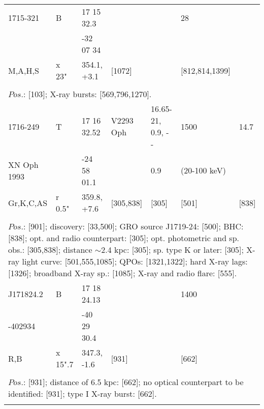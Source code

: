 \documentclass{aa}
\begin{document}
\begin{tabular}{p{2.5cm}p{1cm}p{1.8cm}p{2.3cm}p{3.3cm}p{2.0cm}p{2.2cm}}
\noalign{\smallskip}
1715-321        & B               & 17 15 32.3         &                      &                           & 28                        &     \\
                         &                   & -32 07 34           &                      &                           &                              &      \\
M,A,H,S          & x 23"        & 354.1, +3.1        & [1072]          &                           & [812,814,1399]  &       \\
\\
\multicolumn{7}{p{17.5cm}}{
$Pos$.: [103]; X-ray bursts: [569,796,1270].}\\
\noalign{\smallskip}
\hline

\noalign{\smallskip}
1716-249          & T             & 17 16 32.52     & V2293 Oph     & 16.65-21, 0.9, - -     & 1500                  & 14.7     \\
XN Oph 1993  &                 & -24 58 01.1     &                           & 0.9                             & (20-100 keV)   &    \\
Gr,K,C,AS        & r 0.5"     & 359.8, +7.6      & [305,838]         & [305]                         & [501]                 & [838]   \\
\\
\multicolumn{7}{p{17.5cm}}{
$Pos$.: [901]; discovery: [33,500]; GRO source J1719-24: [500]; BHC: [838]; opt. and radio counterpart: [305]; opt. 
photometric and sp. obs.: [305,838]; distance $\sim$2.4 kpc: [305]; sp. type K or later: [305]; X-ray light curve: 
[501,555,1085]; QPOs: [1321,1322]; hard X-ray lags: [1326]; broadband X-ray sp.: [1085];
X-ray and radio flare: [555].}\\
\noalign{\smallskip}
\hline

\noalign{\smallskip}
J171824.2    &  B           & 17 18 24.13   &                    &          & 1400             &      \\
-402934        &                & -40 29 30.4    &                    &           &                       &    \\
R,B                & x 15".7   & 347.3, -1.6     & [931]          &           & [662]            &    \\
\\
\multicolumn{7}{p{17.5cm}}{
$Pos$.: [931]; distance of 6.5 kpc: [662]; no optical counterpart to be identified: [931]; type I X-ray burst: [662].}\\
\noalign{\smallskip}
\hline


\end{tabular}
\end{document}
